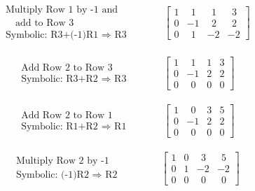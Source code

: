 \begin{eqnarray*}
\begin{array}{l}
\text{Multiply Row 1 by -1 and}\\
\text{~~~add to Row 3}\\
\text{Symbolic: R3+(-1)R1~}\Rightarrow \text{~R3}
\end{array}
&&
~~~~~~~~\left[
\begin{array}{ccc|c}
1 & ~~1 & ~~1 & ~~3\\
0 & -1 & ~~2 & ~~2\\
0 & ~~1 & -2 & -2
\end{array}
\right]
\end{eqnarray*}

\begin{eqnarray*}
\begin{array}{l}
\text{Add Row 2 to Row 3}\\
\text{Symbolic: R3+R2~}\Rightarrow \text{~R3}
\end{array}
&&
~~~~~~~~\left[
\begin{array}{ccc|c}
1 & ~~1 & 1 & 3\\
0 & -1 & 2 & 2\\
0 & ~~0 & 0 & 0
\end{array}
\right]
\end{eqnarray*}

\begin{eqnarray*}
\begin{array}{l}
\text{Add Row 2 to Row 1}\\
\text{Symbolic: R1+R2~}\Rightarrow \text{~R1}
\end{array}
&&
~~~~~~~~\left[
\begin{array}{ccc|c}
1 & ~~0 & 3 & 5\\
0 & -1 & 2 & 2\\
0 & ~~0 & 0 & 0
\end{array}
\right]
\end{eqnarray*}

\begin{eqnarray*}
\begin{array}{l}
\text{Multiply Row 2 by -1}\\
\text{Symbolic: (-1)R2~}\Rightarrow \text{~R2}
\end{array}
&&
~~~~~~~~~~~\left[
\begin{array}{ccc|c}
1 & 0 & ~~3 & ~~5\\
0 & 1 & -2 & -2\\
0 & 0 & ~~0 & ~~0
\end{array}
\right]
\end{eqnarray*}

